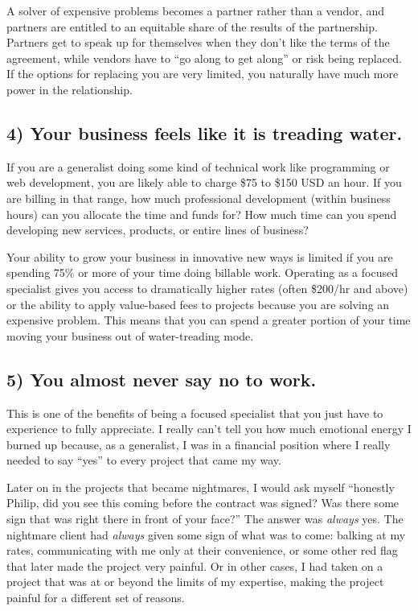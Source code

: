 A solver of expensive problems becomes a partner rather than a vendor, and partners are entitled to an equitable share of the results of the partnership. Partners get to speak up for themselves when they don't like the terms of the agreement, while vendors have to ``go along to get along'' or risk being replaced. If the options for replacing you are very limited, you naturally have much more power in the relationship.

\subsection{4) \textbf{Your business feels like it is treading water}.}

If you are a generalist doing some kind of technical work like programming or web development, you are likely able to charge \$75 to \$150 USD an hour. If you are billing in that range, how much professional development (within business hours) can you allocate the time and funds for? How much time can you spend developing new services, products, or entire lines of business?

Your ability to grow your business in innovative new ways is limited if you are spending 75\% or more of your time doing billable work. Operating as a focused specialist gives you access to dramatically higher rates (often \$200/hr and above) or the ability to apply value-based fees to projects because you are solving an expensive problem. This means that you can spend a greater portion of your time moving your business out of water-treading mode.

\subsection{5) \textbf{You almost never say no to work}.}

This is one of the benefits of being a focused specialist that you just have to experience to fully appreciate. I really can't tell you how much emotional energy I burned up because, as a generalist, I was in a financial position where I really needed to say ``yes'' to every project that came my way.

Later on in the projects that became nightmares, I would ask myself ``honestly Philip, did you see this coming before the contract was signed? Was there some sign that was right there in front of your face?'' The answer was \emph{always} yes. The nightmare client had \emph{always} given some sign of what was to come: balking at my rates, communicating with me only at their convenience, or some other red flag that later made the project very painful. Or in other cases, I had taken on a project that was at or beyond the limits of my expertise, making the project painful for a different set of reasons.

